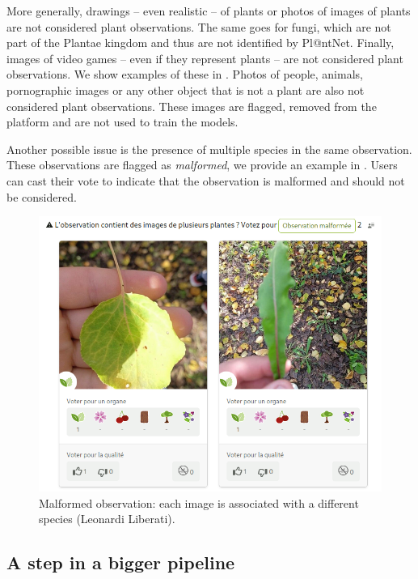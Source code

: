 More generally, drawings -- even realistic -- of plants or photos of images of plants are not considered plant observations.
The same goes for fungi, which are not part of the Plantae kingdom and thus are not identified by Pl@ntNet.
Finally, images of video games -- even if they represent plants -- are not considered plant observations.
We show examples of these in .
Photos of people, animals, pornographic images or any other object that is not a plant are also not considered plant observations.
These images are flagged, removed from the platform and are not used to train the models.

Another possible issue is the presence of multiple species in the same observation.
These observations are flagged as \emph{malformed}, we provide an example in .
Users can cast their vote to indicate that the observation is malformed and should not be considered.

\begin{figure}[htbp]
        \centering
        \includegraphics[width=.75\textwidth]{./images_plantnet/maformed_leonardo_liberati.png}
        \caption{Malformed observation: each image is associated with a different species (\textcopyright Leonardi Liberati).}
        \label{fig:malformed_observation}
\end{figure}

\subsection{A step in a bigger pipeline}
\label{sub:pipeline_plantnet}

